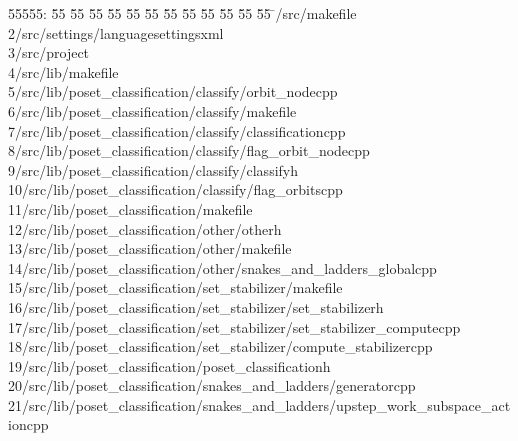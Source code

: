 %
%
\begin{tabbing}
55555: \= 55 \= 55 \= 55 \= 55 \= 55 \= 55 \= 55 \= 55 \= 55 \= 55 \= 55 \= 55 \= \>/src/makefile\\[0pt]
2\>/src/settings/languagesettingsxml\\[0pt]
3\>/src/project\\[0pt]
4\>/src/lib/makefile\\[0pt]
5\>/src/lib/poset\_classification/classify/orbit\_nodecpp\\[0pt]
6\>/src/lib/poset\_classification/classify/makefile\\[0pt]
7\>/src/lib/poset\_classification/classify/classificationcpp\\[0pt]
8\>/src/lib/poset\_classification/classify/flag\_orbit\_nodecpp\\[0pt]
9\>/src/lib/poset\_classification/classify/classifyh\\[0pt]
10\>/src/lib/poset\_classification/classify/flag\_orbitscpp\\[0pt]
11\>/src/lib/poset\_classification/makefile\\[0pt]
12\>/src/lib/poset\_classification/other/otherh\\[0pt]
13\>/src/lib/poset\_classification/other/makefile\\[0pt]
14\>/src/lib/poset\_classification/other/snakes\_and\_ladders\_globalcpp\\[0pt]
15\>/src/lib/poset\_classification/set\_stabilizer/makefile\\[0pt]
16\>/src/lib/poset\_classification/set\_stabilizer/set\_stabilizerh\\[0pt]
17\>/src/lib/poset\_classification/set\_stabilizer/set\_stabilizer\_computecpp\\[0pt]
18\>/src/lib/poset\_classification/set\_stabilizer/compute\_stabilizercpp\\[0pt]
19\>/src/lib/poset\_classification/poset\_classificationh\\[0pt]
20\>/src/lib/poset\_classification/snakes\_and\_ladders/generatorcpp\\[0pt]
21\>/src/lib/poset\_classification/snakes\_and\_ladders/upstep\_work\_subspace\_actioncpp\\[0pt]

\end{tabbing}
